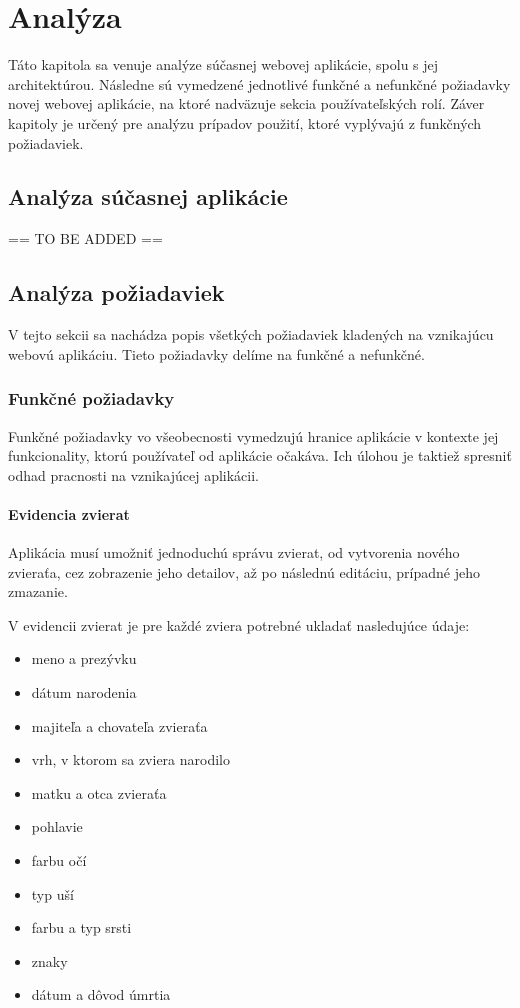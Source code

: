 \chapter{Analýza}
Táto kapitola sa venuje analýze súčasnej webovej aplikácie, spolu s jej architektúrou. Následne sú vymedzené jednotlivé funkčné a nefunkčné požiadavky novej webovej aplikácie, na ktoré nadväzuje sekcia používateľských rolí. Záver kapitoly je určený pre analýzu prípadov použití, ktoré vyplývajú z funkčných požiadaviek.

\section{Analýza súčasnej aplikácie}
== TO BE ADDED ==

\section{Analýza požiadaviek}
V tejto sekcii sa nachádza popis všetkých požiadaviek kladených na vznikajúcu webovú aplikáciu.
Tieto požiadavky delíme na funkčné a nefunkčné.

\subsection{Funkčné požiadavky}\label{funkcne-poziadavky}
Funkčné požiadavky vo všeobecnosti vymedzujú hranice aplikácie v kontexte jej funkcionality, ktorú používateľ od aplikácie očakáva. Ich úlohou je taktiež spresniť odhad pracnosti na vznikajúcej aplikácii.\cite{funkcne-poziadavky}

\subsubsection{Evidencia zvierat}\label{evidencia-zvierat}
Aplikácia musí umožniť jednoduchú správu zvierat, od vytvorenia nového zvieraťa, cez zobrazenie jeho detailov, až po následnú editáciu, prípadné jeho zmazanie.

\hfill \break
V evidencii zvierat je pre každé zviera potrebné ukladať nasledujúce údaje:

\begin{itemize}
	\item meno a prezývku
	\item dátum narodenia
	\item majiteľa a chovateľa zvieraťa
	\item vrh, v ktorom sa zviera narodilo
	\item matku a otca zvieraťa
	\item pohlavie
	\item farbu očí
	\item typ uší
	\item farbu a typ srsti
	\item znaky
	\item dátum a dôvod úmrtia
\end{itemize}

